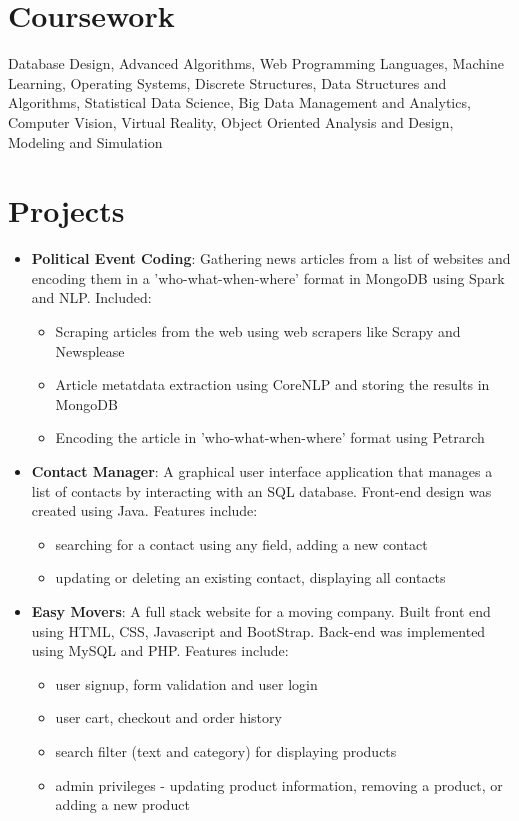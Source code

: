 \documentclass[letterpaper,11pt]{article}
\begin{document}
  
  
    
   \section{Coursework}
Database Design, Advanced Algorithms, Web Programming Languages, Machine Learning, Operating Systems,  Discrete Structures, Data Structures and Algorithms,  Statistical Data Science, Big Data Management and Analytics, Computer Vision, Virtual Reality, Object Oriented Analysis and Design, Modeling and Simulation
  

  
  \section{Projects}
 \begin{itemize}[noitemsep,nolistsep,leftmargin=*]
 \item \textbf{Political Event Coding}: Gathering news articles from a list of websites and encoding them in a 'who-what-when-where' format in MongoDB using Spark and NLP. Included:
\begin{itemize}[noitemsep,nolistsep,leftmargin=*]
\item Scraping articles from the web using web scrapers like Scrapy and Newsplease
\item Article metatdata extraction using CoreNLP and storing the results in MongoDB
\item Encoding the article in 'who-what-when-where' format using Petrarch
\end{itemize}

\item \textbf{Contact Manager}: A graphical user interface application that manages a list of contacts by interacting with an SQL database. Front-end design was created using Java. Features include:
\begin{itemize}[noitemsep,nolistsep,leftmargin=*]
\item searching for a contact using any field,  adding a new contact
\item  updating or deleting an existing contact, displaying all contacts
\end{itemize}

      
\item \textbf{Easy Movers}: A full stack website for a moving company. Built front end using HTML, CSS, Javascript and BootStrap. Back-end was implemented using MySQL and PHP. Features include:
 \begin{itemize}[noitemsep,nolistsep,leftmargin=*]
 \item  user signup, form validation and user login
 \item user cart, checkout and order history 
 \item search filter (text and category) for displaying products  
 \item admin privileges - updating product information, removing a product, or adding a new product
 \end{itemize}
      

\end{itemize}
\end{document}
